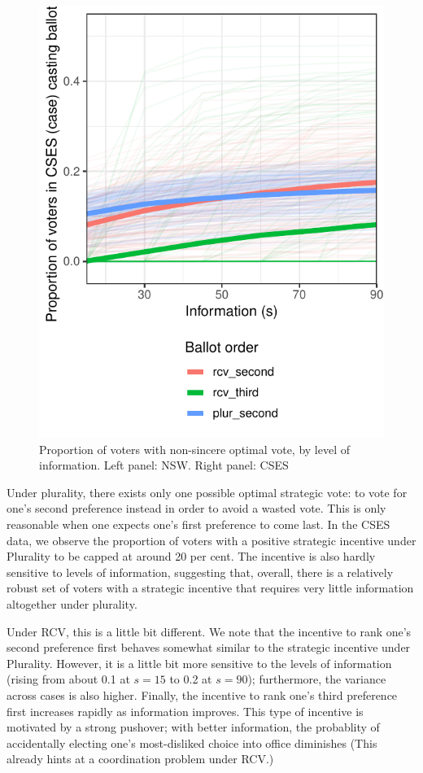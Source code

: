 \documentclass[11pt, letter]{article}
\begin{document}
\begin{figure}[!h]
	\centering
	\includegraphics[width = .6 \textwidth]{../output/figures/cses_freq.pdf}
	\caption{Proportion of voters with non-sincere optimal vote, by level of information. Left panel: NSW. Right panel: CSES}
	\label{fig:sv_prop}
\end{figure}

Under plurality, there exists only one possible optimal strategic vote: to vote for one's second preference instead in order to avoid a wasted vote. This is only reasonable when one expects one's first preference to come last. In the CSES data, we observe the proportion of voters with a positive strategic incentive under Plurality to be capped at around 20 per cent. The incentive is also hardly sensitive to levels of information, suggesting that, overall, there is a relatively robust set of voters with a strategic incentive that requires very little information altogether under plurality.

Under RCV, this is a little bit different. We note that the incentive to rank one's second preference first behaves somewhat similar to the strategic incentive under Plurality. However, it is a little bit more sensitive to the levels of information (rising from about 0.1 at $s = 15$ to 0.2 at $s = 90$); furthermore, the variance across cases is also higher. Finally, the incentive to rank one's third preference first increases rapidly as information improves. This type of incentive is motivated by a strong pushover; with better information, the probablity of accidentally electing one's most-disliked choice into office diminishes (This already hints at a coordination problem under RCV.)
\end{document}
